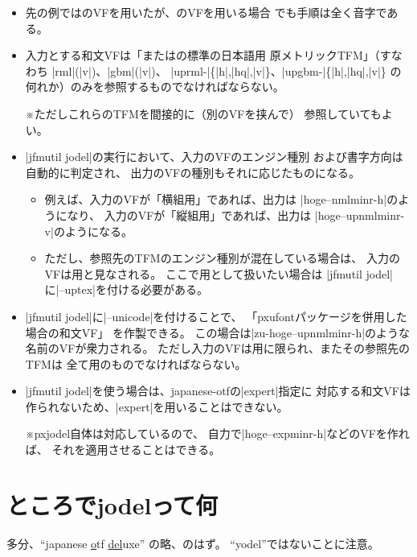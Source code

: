 \documentclass[uplatex,dvipdfmx,a4paper]{jsarticle}
\newcommand{\Pkg}[1]{\textsf{#1}}
\newcommand{\Note}{\par\noindent ※}
\begin{document}
\begin{itemize}
\item 先の例では{\pTeX}のVFを用いたが、{\upTeX}のVFを用いる場合
  でも手順は全く音字である。
\item 入力とする和文VFは「{\pTeX}または{\upTeX}の標準の日本語用
  原メトリックTFM」（すなわち
  |rml|(|v|)、|gbm|(|v|)、
  |uprml-|\{|h|,|hq|,|v|\}、|upgbm-|\{|h|,|hq|,|v|\}
  の何れか）のみを参照するものでなければならない。
  \Note ただしこれらのTFMを間接的に（別のVFを挟んで）
  参照していてもよい。
\item |jfmutil jodel|の実行において、入力のVFのエンジン種別
  および書字方向は自動的に判定され、
  出力のVFの種別もそれに応じたものになる。
  \begin{itemize}
  \item 例えば、入力のVFが「{\pTeX}横組用」であれば、出力は
    |hoge--nmlminr-h|のようになり、
    入力のVFが「{\upTeX}縦組用」であれば、出力は
    |hoge--upnmlminr-v|のようになる。
  \item ただし、参照先のTFMのエンジン種別が混在している場合は、
    入力のVFは{\pTeX}用と見なされる。
    ここで{\upTeX}用として扱いたい場合は
    |jfmutil jodel|に|--uptex|を付ける必要がある。
  \end{itemize}
\item |jfmutil jodel|に|--unicode|を付けることで、
  「\Pkg{pxufont}パッケージを併用した場合の和文VF」
  を作製できる。
  この場合は|zu-hoge--upnmlminr-h|のような名前のVFが衆力される。
  ただし入力のVFは{\upTeX}用に限られ、またその参照先のTFMは
  全て{\upTeX}用のものでなければならない。    
\item |jfmutil jodel|を使う場合は、\Pkg{japanese-otf}の|expert|指定に
  対応する和文VFは作られないため、|expert|を用いることはできない。
  \Note \Pkg{pxjodel}自体は対応しているので、
  自力で|hoge--expminr-h|などのVFを作れば、
  それを適用させることはできる。
\end{itemize}

\section{ところでjodelって何}
\label{sec:Jodel}

多分、“\underline{j}apanese \underline{o}tf \underline{del}uxe”
の略、のはず。
“yodel”ではないことに注意。

\end{document}

